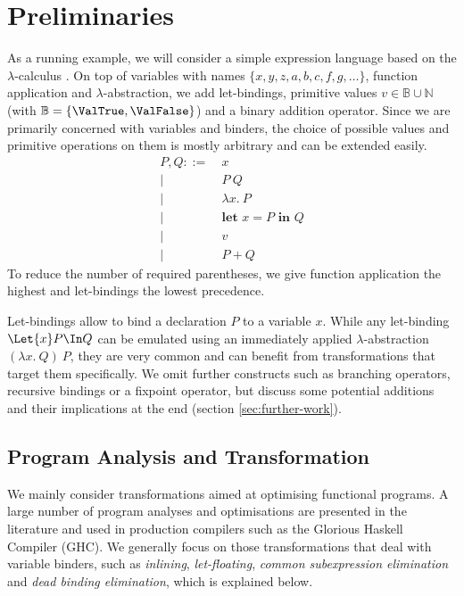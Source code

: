 \chapter{Preliminaries}
\label{ch:preliminaries}
    As a running example, we will consider a simple expression language
    based on the $\lambda$-calculus
    \cite{Barendregt1985LambdaCalculus}.
    On top of variables with names $\{ x, y, z, a, b, c, f, g, \ldots \}$, function application and $\lambda$-abstraction,
    we add let-bindings, primitive values $v \in \mathbb{B} \cup \mathbb{N}$ (with $\mathbb{B} = \{ \ValTrue , \ValFalse \}$) and a binary addition operator.
    Since we are primarily concerned with variables and binders,
    the choice of possible values and primitive operations on them is mostly arbitrary and can be extended easily.
    \begin{align*}
      P, Q ::=&\ x
      \\ \big|&\ P\ Q
      \\ \big|&\ \lambda x.\ P
      \\ \big|&\ \textbf{let } x = P \textbf{ in } Q
      \\ \big|&\ v
      \\ \big|&\ P + Q
    \end{align*}
    To reduce the number of required parentheses,
    we give function application the highest
    and let-bindings the lowest precedence.

    Let-bindings allow to bind a declaration $P$ to a variable $x$.
    While any let-binding $\Let{x} P \In Q$ can be emulated
    using an immediately applied $\lambda$-abstraction $(\lambda x.\ Q)\ P$,
    they are very common and can benefit
    from transformations that target them specifically.
    We omit further constructs such as branching operators,
    recursive bindings or a fixpoint operator,
    but discuss some potential additions and their implications
    at the end (section \ref{sec:further-work}).

\section{Program Analysis and Transformation}
\label{sec:program-transformations}
    We mainly consider transformations aimed at optimising functional programs.
    A large number of program analyses and optimisations are presented in the literature
    \cite{Nielson1999PrinciplesProgramAnalysis}
    \cite{Santos1995CompilationByTransformation}
    and used in production compilers such as the Glorious Haskell Compiler (GHC).
    We generally focus on those transformations that deal with variable binders,
    such as
    \emph{inlining},
    \emph{let-floating},
    \emph{common subexpression elimination} and
    \emph{dead binding elimination},
    which is explained below.

